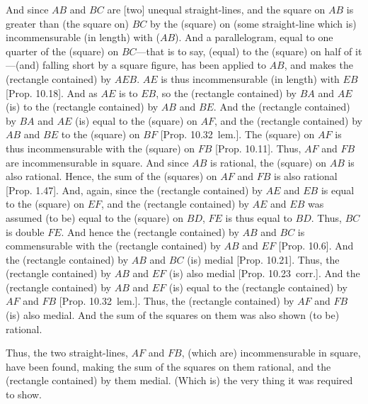 \begin{Parallel}{}{}
{And since $AB$ and $BC$ are [two] unequal straight-lines, and the square
on $AB$ is greater than (the square on) $BC$ by the (square) on (some
straight-line which is) incommensurable (in length) with ($AB$). And a parallelogram,
equal to one quarter of the (square) on $BC$---that is to say, (equal) to the
(square) on half of it---(and) falling short by a square figure, has
been applied to $AB$, and  makes the (rectangle contained) by $AEB$.
$AE$ is thus incommensurable (in length) with $EB$ [Prop. 10.18]. And as $AE$ is to $EB$, so the
(rectangle contained) by $BA$ and $AE$ (is) to the (rectangle contained) by
$AB$ and $BE$.
 And the (rectangle contained) by $BA$ and $AE$ (is) equal to the (square) on $AF$, and the (rectangle contained) by $AB$ and $BE$ to the (square) on
$BF$ [Prop. 10.32~lem.]. The (square) on
$AF$ is thus incommensurable with the (square) on $FB$ [Prop. 10.11]. Thus, $AF$ and $FB$ are
incommensurable in square. And since $AB$ is rational,
the (square) on $AB$ is also rational. Hence, the sum of the
(squares) on $AF$ and $FB$ is also rational [Prop. 1.47]. And, again, since the (rectangle
contained) by $AE$ and $EB$ is equal to the (square) on $EF$, and
the (rectangle contained) by $AE$ and $EB$ 
was assumed (to be) equal to the (square) on $BD$, $FE$ is thus equal to $BD$. Thus, $BC$
is double $FE$. And hence the (rectangle contained) by $AB$ and $BC$ is commensurable with the (rectangle contained) by $AB$ and $EF$ [Prop. 10.6]. And the (rectangle contained) by
$AB$ and $BC$ (is) medial [Prop. 10.21]. 
Thus, the (rectangle contained) by $AB$ and $EF$ (is) also medial
[Prop. 10.23~corr.].  And the (rectangle contained)
by $AB$ and $EF$ (is) equal to the (rectangle contained) by $AF$ and $FB$
[Prop. 10.32~lem.]. Thus, the (rectangle
contained) by $AF$ and $FB$ (is) also medial. And the
sum of the squares on them was also shown (to be) rational.

Thus, the two straight-lines, $AF$ and $FB$, (which are)
incommensurable in  square, have been found, making the
sum of the squares on them rational, and the (rectangle contained)
by them medial. (Which is) the very thing it was required to show.}
\end{Parallel}



